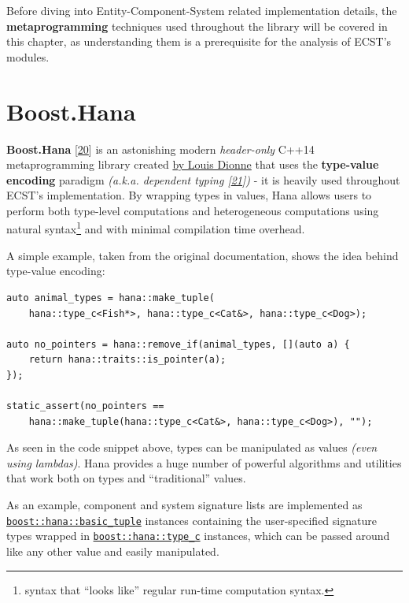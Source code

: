 \documentclass[twoside, 12pt, a4paper, openright]{book}
\begin{document}
Before diving into Entity-Component-System related implementation
details, the \textbf{metaprogramming} techniques used throughout the
library will be covered in this chapter, as understanding them is a
prerequisite for the analysis of ECST's modules.

\section{Boost.Hana}\label{boost.hana}

\textbf{Boost.Hana} {[}\protect\hyperlink{ref-boosthana}{20}{]} is an
astonishing modern \emph{header-only} C++14 metaprogramming library
created \href{http://ldionne.com/}{by Louis Dionne} that uses the
\textbf{type-value encoding} paradigm \emph{(a.k.a. dependent typing
{[}\protect\hyperlink{ref-pfultz2_dependentyping}{21}{]})} - it is
heavily used throughout ECST's implementation. By wrapping types in
values, Hana allows users to perform both type-level computations and
heterogeneous computations using natural syntax\footnote{syntax that
  ``looks like'' regular run-time computation syntax.} and with minimal
compilation time overhead.

A simple example, taken from the original documentation, shows the idea
behind type-value encoding:

\begin{verbatim}
auto animal_types = hana::make_tuple(
    hana::type_c<Fish*>, hana::type_c<Cat&>, hana::type_c<Dog>);

auto no_pointers = hana::remove_if(animal_types, [](auto a) {
    return hana::traits::is_pointer(a);
});

static_assert(no_pointers ==
    hana::make_tuple(hana::type_c<Cat&>, hana::type_c<Dog>), "");
\end{verbatim}

As seen in the code snippet above, types can be manipulated as values
\emph{(even using lambdas)}. Hana provides a huge number of powerful
algorithms and utilities that work both on types and ``traditional''
values.

As an example, component and system signature lists are implemented as
\href{http://www.boost.org/doc/libs/1_61_0/libs/hana/doc/html/structboost_1_1hana_1_1basic__tuple.html}{\texttt{boost::hana::basic_tuple}}
instances containing the user-specified signature types wrapped in
\href{http://www.boost.org/doc/libs/1_61_0/libs/hana/doc/html/structboost_1_1hana_1_1type.html\#ae35139e732c4b75e91061513cf445628}{\texttt{boost::hana::type_c}}
instances, which can be passed around like any other value and easily
manipulated.
\end{document}
